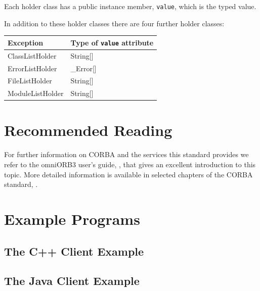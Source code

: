 \documentclass[\pformat,12pt]{article}
\begin{document}
Each holder class has a public instance member, \texttt{value}, which is
the typed value.

In addition to these holder classes there are four further holder
classes: 

\begin{tabular}{|>{\ttfamily}p{5.5cm}|>{\ttfamily}p{5.5cm}|}
  \hline
\textrm{\bfseries Exception} & \textrm{\bfseries Type of \texttt{value} attribute}
  \\ \hline
ClassListHolder  &  String[] \\ \hline
ErrorListHolder  &  \_Error[] \\ \hline
FileListHolder   & String[] \\ \hline
ModuleListHolder & String[] \\ \hline
\end{tabular}


\newpage
\section{Recommended Reading}
For further information on CORBA and the services this standard
provides we refer to the omniORB3 user's guide, \cite{omniORB3}, that
gives an excellent introduction to this topic. More detailed
information is available in selected chapters of the CORBA standard,
\cite{OMG&96}. 




\newpage
\appendix

\newpage
\section{Example Programs}
\subsection{The C++ Client Example}
\label{A3}
\subsection{The Java Client Example}
\label{A4}
\end{document}
